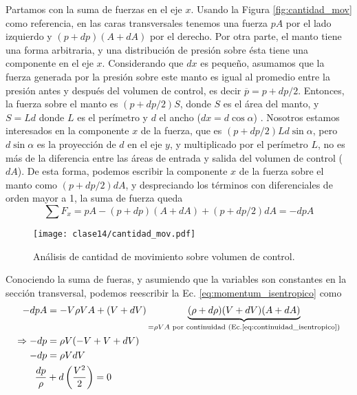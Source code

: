Partamos con la suma de fuerzas en el eje $x$.
Usando la Figura \ref{fig:cantidad_mov} como referencia, en las caras transversales tenemos una fuerza $pA$ por el lado izquierdo y $(p+dp)(A+dA)$ por el derecho.
Por otra parte, el manto tiene una forma arbitraria, y una distribución de presión sobre ésta tiene una componente en el eje $x$.
Considerando que $dx$ es pequeño, asumamos que la fuerza generada por la presión sobre este manto es igual al promedio entre la presión antes y después del volumen de control, es decir $\overline{p} = p+dp/2$.
Entonces, la fuerza sobre el manto es $(p+dp/2)S$, donde $S$ es el área del manto, y $S=Ld$ donde $L$ es el perímetro y $d$ el ancho ($dx=d\cos\alpha$) .
Nosotros estamos interesados en la componente $x$ de la fuerza, que es $(p+dp/2)Ld\sin\alpha$, pero $d\sin\alpha$ es la proyección de $d$ en el eje $y$, y multiplicado por el perímetro $L$, no es más de la diferencia entre las áreas de entrada y salida del volumen de control ($dA$).
De esta forma, podemos escribir la componente $x$ de la fuerza sobre el manto como $(p+dp/2)dA$, y despreciando los términos con diferenciales de orden mayor a 1, la suma de fuerza queda
%
\begin{equation}
\sum F_x = pA - (p+dp)(A+dA) + (p+dp/2)dA = -dpA
\end{equation}
%
\begin{figure}
\centering
\texttt{[image: clase14/cantidad\_mov.pdf]}
\caption{Análisis de cantidad de movimiento sobre volumen de control.}
\label{fig:volumen_control}
\end{figure}

Conociendo la suma de fueras, y asumiendo que la variables son constantes en la sección transversal, podemos reescribir la Ec. \eqref{eq:momentum_isentropico} como
%
\begin{align}
-dpA &= -V\rho VA + (V+dV)\underbrace{(\rho+d\rho)(V+dV)(A+dA)}_{=\rho VA\text{ por continuidad (Ec.\eqref{eq:continuidad_isentropico})}}\nonumber\\
\Rightarrow -dp &= \rho V(-V+V+dV)\nonumber\\
-dp &= \rho VdV\nonumber\\
\frac{dp}{\rho} &+ d\left(\frac{V^2}{2}\right) = 0
\end{align}
